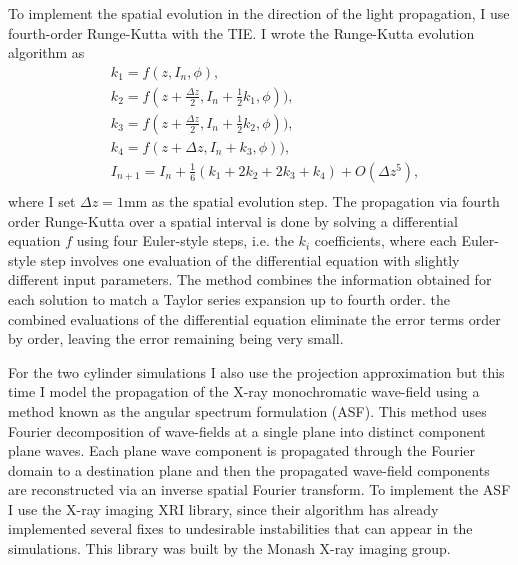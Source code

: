\documentclass[9pt, a4paper]{article}
\begin{document}
To implement the spatial evolution in the direction of the light propagation, I use fourth-order Runge-Kutta with the TIE. I wrote the Runge-Kutta evolution algorithm as
\begin{equation} \label{eq:4}
\begin{split}
&k_1 = f(z, I_n, \phi),\\
&k_2 = f(z + \frac{\Delta z}{2}, I_n + \frac{1}{2}k_1, \phi)),\\
&k_3 = f(z + \frac{\Delta z}{2}, I_n + \frac{1}{2}k_2, \phi)),\\
&k_4 = f(z + \Delta z, I_n + k_3, \phi)),\\
&I_{n + 1} = I_{n} + \frac{1}{6}(k_1 + 2k_2 + 2k_3 + k_4) + O(\Delta z^5),\\
\end{split}
\end{equation}
where I set $\Delta z = 1$mm as the spatial evolution step. The propagation via fourth order Runge-Kutta over a spatial interval is done by solving a differential equation $f$ using four Euler-style steps, i.e. the $k_i$ coefficients, where each Euler-style step involves one evaluation of the differential equation with slightly different input parameters. The method combines the information obtained for each solution to match a Taylor series expansion up to fourth order. the combined evaluations of the differential equation eliminate the error terms order by order, leaving the error remaining being very small\cite{N_R}.

For the two cylinder simulations I also use the projection approximation but this time I model the propagation of the X-ray monochromatic wave-field using a method known as the angular spectrum formulation (ASF). This method uses Fourier decomposition of wave-fields at a single plane into distinct component plane waves. Each plane wave component is propagated through the Fourier domain to a destination plane and then the propagated wave-field components are reconstructed via an inverse spatial Fourier transform\cite{Goodman}. To implement the ASF I use the X-ray imaging XRI library, since their algorithm has already implemented several fixes to undesirable instabilities that can appear in the simulations. This library was built by the Monash X-ray imaging group.
\end{document}
